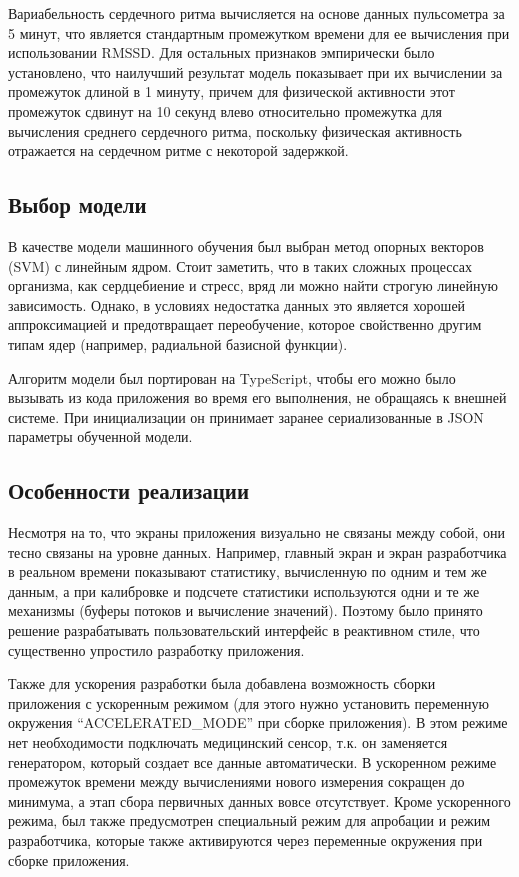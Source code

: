 \documentclass[14pt]{matmex-diploma-custom}
\begin{document}
Вариабельность сердечного ритма вычисляется на основе данных пульсометра за 5
минут, что является стандартным промежутком времени для ее вычисления при
использовании RMSSD. Для остальных признаков эмпирически было установлено, что
наилучший результат модель показывает при их вычислении за промежуток длиной в 1
минуту, причем для физической активности этот промежуток сдвинут на 10 секунд
влево относительно промежутка для вычисления среднего сердечного ритма,
поскольку физическая активность отражается на сердечном ритме с некоторой
задержкой.

\subsection{Выбор модели}
В качестве модели машинного обучения был выбран метод опорных векторов (SVM) с
линейным ядром. Стоит заметить, что в таких сложных процессах организма, как
сердцебиение и стресс, вряд ли можно найти строгую линейную зависимость. Однако,
в условиях недостатка данных это является хорошей аппроксимацией и предотвращает
переобучение, которое свойственно другим типам ядер (например, радиальной
базисной функции).

Алгоритм модели был портирован на TypeScript, чтобы его можно было вызывать из
кода приложения во время его выполнения, не обращаясь к внешней системе. При
инициализации он принимает заранее сериализованные в JSON параметры обученной
модели.

\subsection{Особенности реализации}
Несмотря на то, что экраны приложения визуально не связаны между собой, они
тесно связаны на уровне данных. Например, главный экран и экран разработчика в
реальном времени показывают статистику, вычисленную по одним и тем же данным, а
при калибровке и подсчете статистики используются одни и те же механизмы (буферы
потоков и вычисление значений). Поэтому было принято решение разрабатывать
пользовательский интерфейс в реактивном стиле, что существенно упростило
разработку приложения.

Также для ускорения разработки была добавлена возможность сборки приложения с
ускоренным режимом (для этого нужно установить переменную окружения
``ACCELERATED\_MODE'' при сборке приложения). В этом режиме нет необходимости
подключать медицинский сенсор, т.к. он заменяется генератором, который создает
все данные автоматически. В ускоренном режиме промежуток времени между
вычислениями нового измерения сокращен до минимума, а этап сбора первичных
данных вовсе отсутствует. Кроме ускоренного режима, был также предусмотрен
специальный режим для апробации и режим разработчика, которые также активируются
через переменные окружения при сборке приложения.
\end{document}
